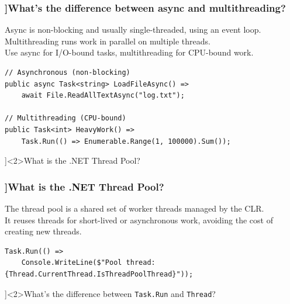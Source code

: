 \begin{frame}[fragile]
  \frametitle{\AnswerTitle[\CategoryBadge[OOPColor!20]{C\#} ]{What's the difference between async and multithreading?}}

  {\footnotesize
  Async is non-blocking and usually single-threaded, using an event loop.\\
  Multithreading runs work in parallel on multiple threads.\\
  Use async for I/O-bound tasks, multithreading for CPU-bound work.
  }

  \begin{verbatim}
// Asynchronous (non-blocking)
public async Task<string> LoadFileAsync() =>
    await File.ReadAllTextAsync("log.txt");

// Multithreading (CPU-bound)
public Task<int> HeavyWork() =>
    Task.Run(() => Enumerable.Range(1, 100000).Sum());
  \end{verbatim}
\end{frame}

\QuestionSlide[\CategoryBadge[PerfColor!20]{Async \& Threading}]<2>{What is the .NET Thread Pool?}

\begin{frame}[fragile]
  \frametitle{\AnswerTitle[\CategoryBadge[OOPColor!20]{C\#} ]{What is the .NET Thread Pool?}}

  {\footnotesize
  The thread pool is a shared set of worker threads managed by the CLR.\\
  It reuses threads for short-lived or asynchronous work, avoiding the cost of creating new threads.
  }

  \begin{verbatim}
Task.Run(() =>
    Console.WriteLine($"Pool thread: {Thread.CurrentThread.IsThreadPoolThread}"));
  \end{verbatim}
\end{frame}

\QuestionSlide[\CategoryBadge[PerfColor!20]{Async \& Threading}]<2>{What's the difference between \texttt{Task.Run} and \texttt{Thread}?}

